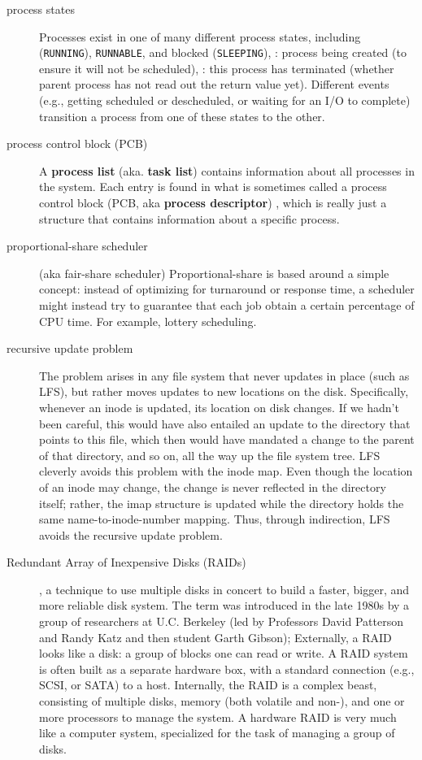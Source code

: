 \begin{description}
\item[process states] Processes exist in one of many different process states, including  (\texttt{RUNNING}),  \texttt{RUNNABLE}, and blocked (\texttt{SLEEPING}), : process being created (to ensure it will not be scheduled), : this process has terminated (whether parent process has not read out the return value yet). Different events (e.g., getting scheduled or descheduled, or waiting for an I/O to complete) transition a process from one of these states to the other.

\item[process control block (PCB)] A \textbf{process list} (aka. \textbf{task list}) contains information about all processes in the system. Each entry is found in what is sometimes called a process control block (PCB, aka \textbf{process descriptor}) , which is really just a structure that contains information about a specific process.

\item[proportional-share scheduler] (aka fair-share scheduler) Proportional-share is based around a simple concept: instead of optimizing for turnaround or response time, a scheduler might instead try to guarantee that each job obtain a certain percentage of CPU time. For example, lottery scheduling.

\item[recursive update problem]  The problem arises in any file system that never updates in place (such as LFS), but rather moves updates to new locations on the disk. Specifically, whenever an inode is updated, its location on disk changes. If we hadn’t been careful, this would have also entailed an update to
the directory that points to this file, which then would have mandated
a change to the parent of that directory, and so on, all the way up the file
system tree. LFS cleverly avoids this problem with the inode map. Even though
the location of an inode may change, the change is never reflected in the
directory itself; rather, the imap structure is updated while the directory
holds the same name-to-inode-number mapping. Thus, through indirection, LFS avoids the recursive update problem.

\item[Redundant Array of Inexpensive Disks (RAIDs)] , a technique to use multiple disks in concert to build a faster, bigger, and more reliable disk system. The term was introduced in the late 1980s by a group of researchers at U.C. Berkeley (led by Professors David Patterson and Randy Katz and then student Garth Gibson); Externally, a RAID looks like a disk: a group of blocks one can read or write. A RAID system is often built as a separate hardware box, with a standard connection (e.g., SCSI, or SATA) to a host. Internally, the RAID is a complex beast, consisting of multiple disks, memory (both volatile and non-), and one or more processors to manage the system. A hardware RAID is very much like a computer system, specialized for the task of managing a group of disks.


\end{description}
